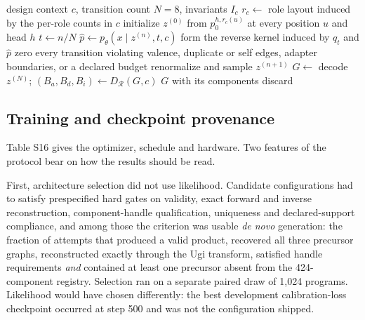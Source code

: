 \documentclass{article}
\newcommand{\decomp}{\ensuremath{D_{\mathcal{R}}}}
\begin{document}
\begin{algorithm}[h]
\caption{Sampling from FORGE. Masked reverse transitions, then admission.}
\label{alg:sample}
\begin{algorithmic}[1]
\REQUIRE design context $c$, transition count $N = 8$, invariants $I_c$
\STATE $r_c \leftarrow$ role layout induced by the per-role counts in $c$
\STATE initialize $z^{(0)}$ from $p_0^{h,r_c(u)}$ at every position $u$ and head $h$
  \STATE $t \leftarrow n / N$
  \STATE $\hat{p} \leftarrow p_\theta(x \mid z^{(n)}, t, c)$ 
  \STATE form the reverse kernel induced by $q_t$ and $\hat{p}$
  \STATE zero every transition violating valence, duplicate or self edges, adapter boundaries, or a declared budget
  \STATE renormalize and sample $z^{(n+1)}$
\ENDFOR
\STATE $G \leftarrow$ decode $z^{(N)}$; $(B_a, B_d, B_i) \leftarrow \decomp(G, c)$
  \RETURN $G$ with its components
\ELSE
  \STATE discard 
\ENDIF
\end{algorithmic}
\end{algorithm}

\subsection{Training and checkpoint provenance}
\label{app:optim}
Table S16 gives the optimizer, schedule and hardware. Two features of the protocol bear on how the
results should be read.

First, architecture selection did not use likelihood. Candidate configurations had to satisfy
prespecified hard gates on validity, exact forward and inverse reconstruction, component-handle
qualification, uniqueness and declared-support compliance, and among those the criterion was usable
\emph{de novo} generation: the fraction of attempts that produced a valid product, recovered all three
precursor graphs, reconstructed exactly through the Ugi transform, satisfied handle requirements
\emph{and} contained at least one precursor absent from the 424-component registry. Selection ran on
a separate paired draw of 1,024 programs. Likelihood would have chosen differently: the best
development calibration-loss checkpoint occurred at step 500 and was not the configuration shipped.
\end{document}
